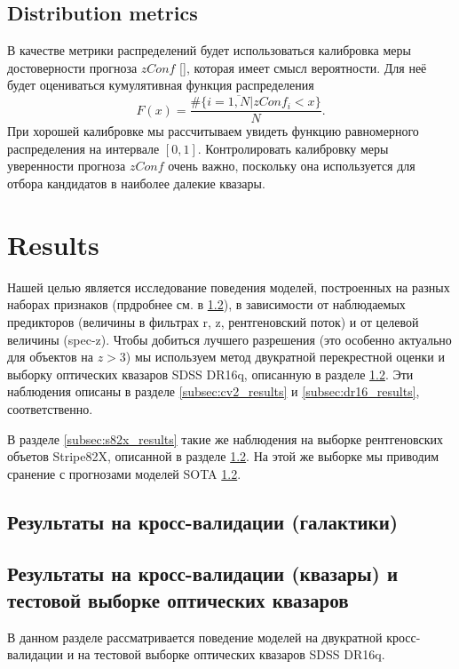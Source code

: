 \documentclass[fleqn,usenatbib]{mnras}
\begin{document}
\subsection{Distribution metrics}\label{sec:dist-metrics}

В качестве метрики распределений будет использоваться калибровка меры достоверности прогноза \(zConf\) \eqref{}, которая имеет смысл вероятности. Для неё будет оцениваться кумулятивная функция распределения \begin{equation}\label{eq:zconf_cal}
    F(x) = \frac{\#\{i = \overline{1, N} | zConf_i < x \}}{N}.
\end{equation}
При хорошей калибровке мы рассчитываем увидеть функцию равномерного распределения на интервале $[0, 1]$. Контролировать калибровку меры уверенности прогноза $zConf$ очень важно, поскольку она используется для отбора кандидатов в наиболее далекие квазары.


\section{Results}
Нашей целью является исследование поведения моделей, построенных на разных наборах признаков (прдробнее см. в \ref{}), в зависимости от наблюдаемых предикторов (величины в фильтрах r, z, рентгеновский поток) и от целевой величины (spec-z). Чтобы добиться лучшего разрешения (это особенно актуально для объектов на $z > 3$) мы используем метод двукратной перекрестной оценки и выборку оптических квазаров SDSS DR16q, описанную в разделе \ref{}. Эти наблюдения описаны в разделе \ref{subsec:cv2_results} и \ref{subsec:dr16_results}, соответственно.

В разделе \ref{subsec:s82x_results} такие же наблюдения на выборке рентгеновских объетов Stripe82X, описанной в разделе \ref{}. На этой же выборке мы приводим сранение с прогнозами моделей SOTA \ref{}.

\subsection{Результаты на кросс-валидации (галактики)}

\subsection{Результаты на кросс-валидации (квазары) и тестовой выборке оптических квазаров}
В данном разделе рассматривается поведение моделей на двукратной кросс-валидации и на тестовой выборке оптических квазаров SDSS DR16q.
\end{document}
